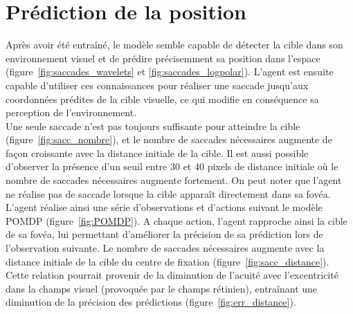 \section{Prédiction de la position}

Après avoir été entraîné, le modèle semble capable de détecter la cible dans son environnement visuel et de prédire précisemment sa position dans l'espace (figure~\ref{fig:saccades_wavelets} et \ref{fig:saccades_logpolar}). L'agent est ensuite capable d'utiliser ces connaissances pour réaliser une saccade jusqu'aux coordonnées prédites de la cible visuelle, ce qui modifie en conséquence sa perception de l'environnement.\\
Une seule saccade n'est pas toujours suffisante pour atteindre la cible (figure~\ref{fig:sacc_nombre}), et le nombre de saccades nécessaires augmente de façon croissante avec la distance initiale de la cible. Il est aussi possible d'observer la présence d'un seuil entre 30 et 40 pixels de distance initiale où le nombre de saccades nécessaires augmente fortement. On peut noter que l'agent ne réalise pas de saccade lorsque la cible apparaît directement dans sa fovéa.\\
L'agent réalise ainsi une série d'observations et d'actions suivant le modèle POMDP (figure~\ref{fig:POMDP}). A chaque action, l'agent rapproche ainsi la cible de sa fovéa, lui permettant d'améliorer la précision de sa prédiction lors de l'observation suivante. 
Le nombre de saccades nécessaires augmente avec la distance initiale de la cible du centre de fixation (figure~\ref{fig:sacc_distance}). \\
Cette relation pourrait provenir de la diminution de l'acuité avec l'excentricité dans la champs visuel (provoquée par le champs rétinien), entraînant une diminution de la précision des prédictions (figure~\ref{fig:err_distance}).\\



